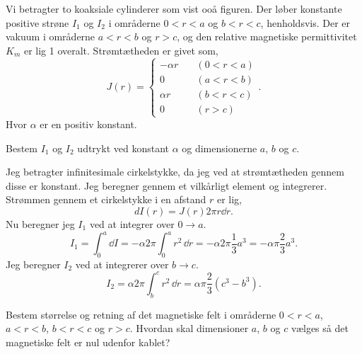 \begin{exercise}[Opgave 2]
	Vi betragter to koaksiale cylinderer  som vist ooå figuren. Der løber konstante positive strøne $I_1$ og $I_2$ i områderne $0<r<a$ og $b<r<c$, henholdsvis. Der er vakuum i områderne  $a<r<b$ og $r>c$, og den relative magnetiske permittivitet $K_m$ er lig 1 overalt. Strømtætheden er givet som,
	\[
	J\left( r \right) = \begin{cases}
		-\alpha r \quad &\left( 0<r<a \right) \\
		0 \quad &\left( a<r<b \right) \\
		\alpha r \quad &\left( b<r<c \right) \\ 
		0 \quad &\left(r>c \right) 
	\end{cases}
	.\]
	Hvor $\alpha $ er en positiv konstant.
\end{exercise}
\begin{figure}[ht]
    \centering
    \label{fig:opgave2}
\end{figure}
\begin{subexercise}[a]
Bestem $I_1$ og $I_2$ udtrykt ved konstant $\alpha $ og dimensionerne $a$, $b$ og $c$.
\end{subexercise}
\begin{solution}
Jeg betragter infinitesimale cirkelstykke, da jeg ved at strømtætheden gennem disse er konstant. Jeg beregner gennem et vilkårligt element og integrerer. Strømmen gennem et cirkelstykke i en afstand $r$ er lig,
 \[
dI\left( r \right) = J\left( r \right) 2\pi r \dd r
.\] 
Nu beregner jeg $I_1$ ved at integrer over $0 \to a$.
\[
I_1 = \int_0^{a} \dd I = -\alpha 2\pi \int_{0}^{a} r^2\, \dd r = -\alpha 2\pi \frac{1}{3}a^{3} = -\alpha\pi \frac{2}{3} a^3
.\]
Jeg beregner $I_2$ ved at integrerer over $b \to c$.
\[
	I_2 = \alpha 2\pi\int_{b}^{c} r^2\, \dd r = \alpha\pi \frac{2}{3}\left( c^{3} - b^3 \right) 
.\] 
\end{solution}
\begin{subexercise}[b]
Bestem størrelse og retning af det magnetiske felt i områderne $0<r<a$, $a<r<b$, $b<r<c$ og $r>c$. Hvordan skal dimensioner $a $, $b$ og $c$ vælges så det magnetiske felt er nul udenfor kablet?
\end{subexercise}
